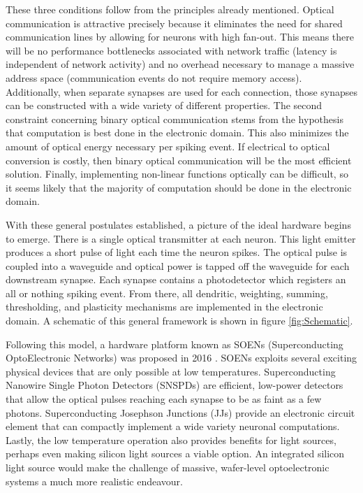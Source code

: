 \documentclass[twocolumn]{article}
\begin{document}
These three conditions follow from the principles already mentioned. Optical communication is attractive precisely because it eliminates the need for shared communication lines by allowing for neurons with high fan-out. This means there will be no performance bottlenecks associated with network traffic (latency is independent of network activity) and no overhead necessary to manage a massive address space (communication events do not require memory access). Additionally, when separate synapses are used for each connection, those synapses can be constructed with a wide variety of different properties. The second constraint concerning binary optical communication stems from the hypothesis that computation is best done in the electronic domain. This also minimizes the amount of optical energy necessary per spiking event. If electrical to optical conversion is costly, then binary optical communication will be the most efficient solution. Finally, implementing non-linear functions optically can be difficult, so it seems likely that the majority of computation should be done in the electronic domain.

With these general postulates established, a picture of the ideal hardware begins to emerge. There is a single optical transmitter at each neuron. This light emitter produces a short pulse of light each time the neuron spikes. The optical pulse is coupled into a waveguide and optical power is tapped off the waveguide for each downstream synapse. Each synapse contains a photodetector which registers an all or nothing spiking event. From there, all dendritic, weighting, summing, thresholding, and plasticity mechanisms are implemented in the electronic domain. A schematic of this general framework is shown in figure \ref{fig:Schematic}.

Following this model, a hardware platform known as SOENs (Superconducting OptoElectronic Networks) was proposed in 2016 \cite{shainline2017superconducting}. SOENs exploits several exciting physical devices that are only possible at low temperatures. Superconducting Nanowire Single Photon Detectors (SNSPDs) are efficient, low-power detectors that allow the optical pulses reaching each synapse to be as faint as a few photons. Superconducting Josephson Junctions (JJs) provide an electronic circuit element that can compactly implement a wide variety neuronal computations. Lastly, the low temperature operation also provides benefits for light sources, perhaps even making silicon light sources a viable option. An integrated silicon light source would make the challenge of massive, wafer-level optoelectronic systems a much more realistic endeavour. 
\end{document}
